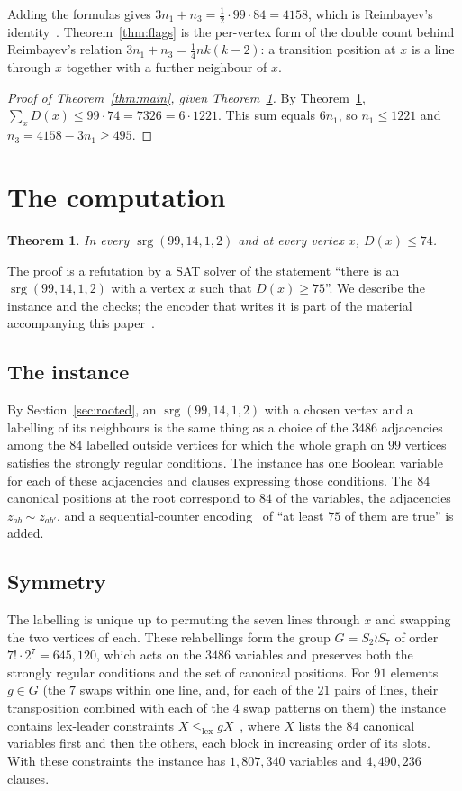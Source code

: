\documentclass[11pt]{amsart}
\newtheorem{theorem}{Theorem}
\theoremstyle{remark}
\newcommand{\srg}{\operatorname{srg}}
\begin{document}
Adding the formulas gives $3n_1+n_3=\frac12\cdot99\cdot84=4158$, which is
Reimbayev's identity~\cite{Reimbayev}. Theorem~\ref{thm:flags} is the
per-vertex form of the double count behind Reimbayev's relation
$3n_1+n_3=\frac14nk(k-2)$: a transition position at $x$ is a line through $x$
together with a further neighbour of $x$.

\begin{proof}[Proof of Theorem~\ref{thm:main}, given Theorem~\ref{thm:sat}]
By Theorem~\ref{thm:sat}, $\sum_xD(x)\le99\cdot74=7326=6\cdot1221$. This sum
equals $6n_1$, so $n_1\le1221$ and $n_3=4158-3n_1\ge495$.
\end{proof}

\section{The computation}\label{sec:sat}

\begin{theorem}\label{thm:sat}
In every $\srg(99,14,1,2)$ and at every vertex $x$, $D(x)\le74$.
\end{theorem}

The proof is a refutation by a SAT solver of the statement ``there is an
$\srg(99,14,1,2)$ with a vertex $x$ such that $D(x)\ge75$''. We describe the
instance and the checks; the encoder that writes it is part of the material
accompanying this paper~\cite{Artifact}.

\subsection*{The instance}
By Section~\ref{sec:rooted}, an $\srg(99,14,1,2)$ with a chosen vertex and a
labelling of its neighbours is the same thing as a choice of the $3486$
adjacencies among the $84$ labelled
outside vertices for which the whole graph on $99$ vertices satisfies the
strongly regular conditions. The instance has one Boolean variable for each of
these adjacencies and clauses expressing those conditions. The $84$ canonical
positions at the root correspond to $84$ of the variables, the adjacencies
$z_{ab}\sim z_{ab'}$, and a sequential-counter encoding~\cite{Sinz} of
``at least $75$ of them are true'' is added.

\subsection*{Symmetry}
The labelling is unique up to permuting the seven lines through $x$ and
swapping the two vertices of each. These relabellings form the group
$G=S_2\wr S_7$ of order $7!\cdot2^7=645{,}120$, which acts on the $3486$
variables and preserves both the strongly regular conditions and the set of
canonical positions. For $91$ elements $g\in G$ (the $7$ swaps within one line,
and, for each of the $21$ pairs of lines, their transposition combined with
each of the $4$ swap patterns on them) the instance contains lex-leader
constraints $X\le_{\mathrm{lex}}gX$~\cite{Crawford}, where $X$ lists the $84$
canonical variables first and then the others, each block in increasing order
of its slots. With these constraints the instance has $1{,}807{,}340$ variables
and $4{,}490{,}236$ clauses.
\end{document}
